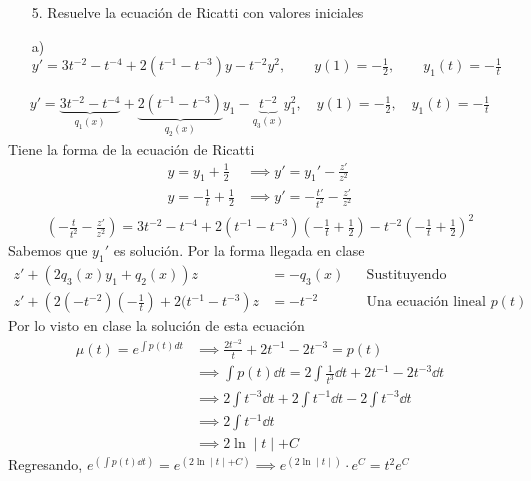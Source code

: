 \begin{enumerate}
    \item[5.] Resuelve la ecuación de Ricatti con valores iniciales
\end{enumerate}
\begin{enumerate}
    \item[a)] $y'=3t^{-2}-t^{-4}+2(t^{-1}-t^{-3})y-t^{-2}y^{2}, \qquad y(1)= - \frac{1}{2}, \qquad y_{1}(t)=-\frac{1}{t}$
\end{enumerate}
\begin{align*}
    y' = \underbrace{3t^{-2}-t^{-4}}_{q_{1}(x)}+\underbrace{2(t^{-1}-t^{-3})}_{q_{2}(x)}y_{1}-\underbrace{t^{-2}}_{q_{3}(x)}y_{1}^{2}, \quad y(1)= - \frac{1}{2}, \quad y_{1}(t)=-\frac{1}{t}
\end{align*}
Tiene la forma de la ecuación de Ricatti
\begin{align*}
    y=y_{1}+\frac{1}{2} & \implies y'=y_{1}'-\frac{z'}{z^{2}}\\
    y = -\frac{1}{t}+\frac{1}{2} & \implies y'= -\frac{t'}{t^{2}}- \frac{z'}{z^{2}}
\end{align*}
\begin{align*}
    \left( -\frac{t}{t^{2}}- \frac{z'}{z^{2}} \right)= 3t^{-2}-t^{-4}+2(t^{-1}-t^{-3})\left( -\frac{1}{t}+\frac{1}{2} \right) -t^{-2} \left( -\frac{1}{t}+\frac{1}{2} \right)^{2}
\end{align*}
Sabemos que $y_{1}'$ es solución. Por la forma llegada en clase
\begin{align*}
    z' +\left(2q_{3}(x)y_{1}+q_{2}(x)\right)z&=-q_{3}(x)
    & & \text{Sustituyendo}\\
    z' + \left(2(-t^{-2})\left( -\frac{1}{t}\right)+2(t^{-1}-t^{-3}\right)z & =-t^{-2}
    & &  \text{Una ecuación lineal }p(t)
\end{align*}
Por lo visto en clase la solución de esta ecuación
\begin{align*}
    \mu(t) = e^{\int p(t)dt} & \implies \frac{2t^{-2}}{t}+2t^{-1}-2t^{-3}=p(t)\\
    & \implies \int p(t)\dd t = 2\int \frac{1}{t^{3}}\dd t + 2t^{-1}-2t^{-3} \dd t\\
    & \implies 2\int t^{-3}\dd t + 2 \int t^{-1} \dd t - 2\int t^{-3} \dd t\\
    & \implies 2 \int t^{-1} \dd t \\
    & \implies 2 \ln \mid t \mid + C 
\end{align*}
Regresando, $\displaystyle e^{\left({\int p(t) \dd t}\right)} = e^{\left( 2 \ln \mid t \mid + C \right)} \implies e^{(2 \ln \mid t \mid)} \cdot e^{C} = t^{2} e^{C}$\\

